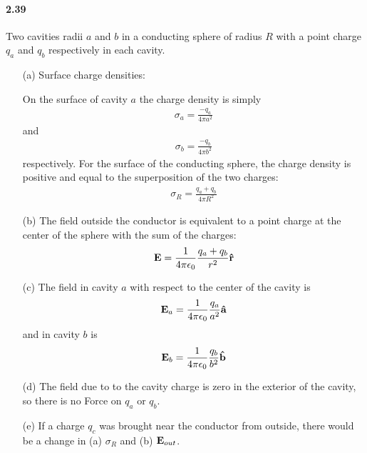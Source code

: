 \documentclass[../main.tex]{subfiles}
\begin{document}
\paragraph{2.39} Two cavities radii $a$ and $b$ in a conducting sphere of radius $R$ with a point charge $q_a$ and $q_b$ respectively in each cavity.
\begin{itemize}
    \item [(a)] Surface charge densities:
    
    On the surface of cavity $a$ the charge density is simply
    \begin{align*}
        \sigma_a = \frac{-q_a}{4\pi a^2}
    \end{align*}
    and 
    \begin{align*}
        \sigma_b = \frac{-q_b}{4\pi b^2}
    \end{align*}
    respectively. For the surface of the conducting sphere, the charge density is positive and equal to the superposition of the two charges:
    \begin{align*}
        \sigma_R = \frac{q_a + q_b}{4\pi R^2}
    \end{align*}
    \item [(b)] The field outside the conductor is equivalent to a point charge at the center of the sphere with the sum of the charges:
    \begin{align*}
        \vb E = \frac{1}{4\pi\epsilon_0} \frac{q_a + q_b}{r^2} \vu r
    \end{align*}
    \item [(c)] The field in cavity $a$ with respect to the center of the cavity is
    \begin{align*}
        \vb E_a = \frac{1}{4\pi\epsilon_0} \frac{q_a}{a^2} \vu a
    \end{align*}
    and in cavity $b$ is
    \begin{align*}
        \vb E_b = \frac{1}{4\pi\epsilon_0} \frac{q_b}{b^2} \vu b
    \end{align*}
    \item [(d)] The field due to to the cavity charge is zero in the exterior of the cavity, so there is no Force on $q_a$ or $q_b$.
    \item [(e)] If a charge $q_c$ was brought near the conductor from outside, there would be a change in (a) $\sigma_R$ and (b) $\vb E_{out}$.
\end{itemize}
\end{document}
